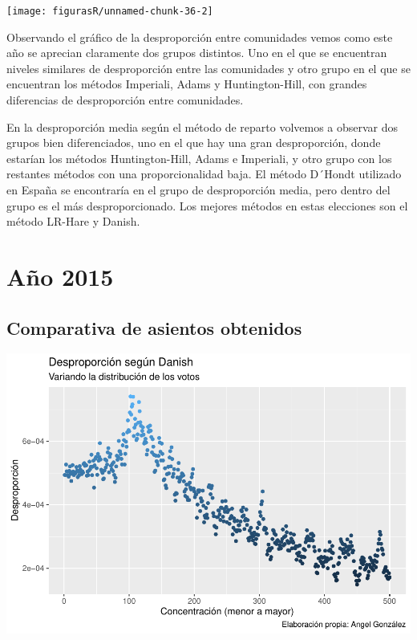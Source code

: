 \documentclass[12pt,a4paper,]{book}
\numberwithin{dummy}{section}
\theoremstyle{ocrenumbox}
\theoremstyle{blacknumex}
\theoremstyle{blacknumbox}
\theoremstyle{ocrenum}
\theoremstyle{ocrenum}
\begin{document}
\begin{center}\texttt{[image: figurasR/unnamed-chunk-36-2]} \end{center}

Observando el gráfico de la desproporción entre comunidades vemos como
este año se aprecian claramente dos grupos distintos. Uno en el que se
encuentran niveles similares de desproporción entre las comunidades y
otro grupo en el que se encuentran los métodos Imperiali, Adams y
Huntington-Hill, con grandes diferencias de desproporción entre
comunidades.

En la desproporción media según el método de reparto volvemos a observar
dos grupos bien diferenciados, uno en el que hay una gran desproporción,
donde estarían los métodos Huntington-Hill, Adams e Imperiali, y otro
grupo con los restantes métodos con una proporcionalidad baja. El método
D´Hondt utilizado en España se encontraría en el grupo de desproporción
media, pero dentro del grupo es el más desproporcionado. Los mejores
métodos en estas elecciones son el método LR-Hare y Danish.

\hypertarget{auxf1o-2015}{%
\section{Año 2015}\label{auxf1o-2015}}

\hypertarget{comparativa-de-asientos-obtenidos-11}{%
\subsection{Comparativa de asientos
obtenidos}\label{comparativa-de-asientos-obtenidos-11}}

\begin{center}\includegraphics[width=1\linewidth]{figurasR/unnamed-chunk-38-1} \end{center}
\end{document}
